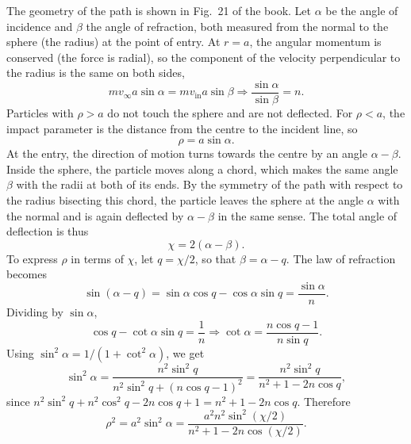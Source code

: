 \begin{problem}[title={Scattering by a spherical potential well}]
{The geometry of the path is shown in Fig.~21 of the book. Let $\alpha$ be the angle of incidence and $\beta$ the angle of refraction, both measured from the normal to the sphere (\ie the radius) at the point of entry. At $r = a$, the angular momentum is conserved (the force is radial), so the component of the velocity perpendicular to the radius is the same on both sides,
\begin{equation*}
    mv_\infty a\sin{\alpha} = mv_{\mathrm{in}}a\sin{\beta} \Rightarrow \frac{\sin{\alpha}}{\sin{\beta}} = n.
\end{equation*}
Particles with $\rho > a$ do not touch the sphere and are not deflected. For $\rho < a$, the impact parameter is the distance from the centre to the incident line, so
\begin{equation*}
    \rho = a\sin{\alpha}.
\end{equation*}
At the entry, the direction of motion turns towards the centre by an angle $\alpha - \beta$. Inside the sphere, the particle moves along a chord, which makes the same angle $\beta$ with the radii at both of its ends. By the symmetry of the path with respect to the radius bisecting this chord, the particle leaves the sphere at the angle $\alpha$ with the normal and is again deflected by $\alpha - \beta$ in the same sense. The total angle of deflection is thus
\begin{equation*}
    \chi = 2(\alpha - \beta).
\end{equation*}
To express $\rho$ in terms of $\chi$, let $q = \chi/2$, so that $\beta = \alpha - q$. The law of refraction becomes
\begin{equation*}
    \sin(\alpha - q) = \sin{\alpha}\cos{q} - \cos{\alpha}\sin{q} = \frac{\sin{\alpha}}{n}.
\end{equation*}
Dividing by $\sin{\alpha}$,
\begin{equation*}
    \cos{q} - \cot{\alpha}\sin{q} = \frac{1}{n} \Rightarrow \cot{\alpha} = \frac{n\cos{q} - 1}{n\sin{q}}.
\end{equation*}
Using $\sin^2{\alpha} = 1/(1 + \cot^2{\alpha})$, we get
\begin{equation*}
    \sin^2{\alpha} = \frac{n^2\sin^2{q}}{n^2\sin^2{q} + (n\cos{q} - 1)^2} = \frac{n^2\sin^2{q}}{n^2 + 1 - 2n\cos{q}},
\end{equation*}
since $n^2\sin^2{q} + n^2\cos^2{q} - 2n\cos{q} + 1 = n^2 + 1 - 2n\cos{q}$. Therefore
\begin{equation*}
    \rho^2 = a^2\sin^2{\alpha} = \frac{a^2n^2\sin^2(\chi/2)}{n^2 + 1 - 2n\cos(\chi/2)}.

\end{equation*}}
\end{problem}
